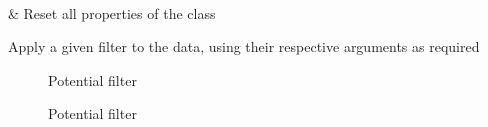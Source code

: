 \documentclass[letterpaper,10pt,english]{sphinxmanual}
\begin{document}
\begin{fulllineitems}
\begin{savenotes}
\begin{longtable}[c]{}
\\
\hline
\sphinxAtStartPar
{\hyperref[\detokenize{_autosummary/signalanalysis.vcg.Vcg:signalanalysis.vcg.Vcg.reset}]{}}
&
\sphinxAtStartPar
Reset all properties of the class
\\
\hline
\end{longtable}\sphinxatlongtableend\end{savenotes}

\begin{fulllineitems}
\label{\detokenize{_autosummary/signalanalysis.vcg.Vcg:signalanalysis.vcg.Vcg.apply_filter}}
\sphinxAtStartPar
Apply a given filter to the data, using their respective arguments as required


\nopagebreak

\begin{description}
\item[{{\hyperref[\detokenize{_autosummary/tools.maths.filter_butterworth:tools.maths.filter_butterworth}]{}}}] \leavevmode
\sphinxAtStartPar
Potential filter

\item[{{\hyperref[\detokenize{_autosummary/tools.maths.filter_savitzkygolay:tools.maths.filter_savitzkygolay}]{}}}] \leavevmode
\sphinxAtStartPar
Potential filter

\end{description}



\end{fulllineitems}



\end{fulllineitems}
\end{document}
